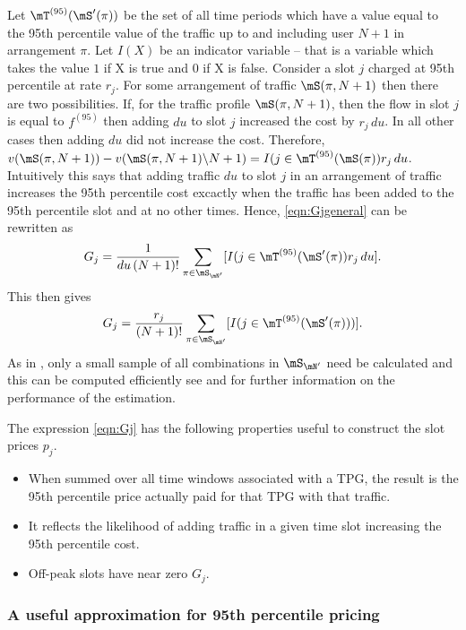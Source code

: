 Let $\mT^{(95)}(\mS'(\pi))$ be the set of all
time periods which have a value equal to the 95th percentile value
of the traffic up to and including user $N+1$ in arrangement $\pi$.
Let $I(X)$ be an indicator variable -- that is a variable which takes
the value $1$ if X is true and $0$ if X is false.
Consider a slot $j$ charged at
95th percentile at rate $r_j$.  
For some arrangement of traffic $\mS(\pi,N+1)$ then there are two
possibilities.  If, for the traffic profile $\mS(\pi,N+1)$, then 
the flow in slot $j$ is equal to $f^{(95)}$ then adding $du$ to
slot $j$ increased the cost by $r_j \, du$.  In all other cases
then adding $du$ did not increase the cost.  Therefore,
$v(\mS(\pi,N+1)) - 
v(\mS(\pi,N+1) \backslash N+1) = I (j \in \mT^{(95)}(\mS(\pi)) r_j \, du$.
Intuitively this says that adding traffic $du$ to slot $j$ in
an arrangement of traffic increases the 95th percentile 
cost excactly when the traffic has been added to the 95th percentile
slot and at no other times.
Hence,  
\eqref{eqn:Gjgeneral} can be rewritten as
$$
G_j = \frac{1}{du\, (N+1)!}  
\sum_{\pi \in \mS_{\mN'}} [I (j \in \mT^{(95)}(\mS'(\pi)) r_j \, du ].
$$ 
This then gives
\begin{equation}
G_j = \frac{r_j}{ (N+1)!} \sum_{\pi \in \mS_{\mN'}} 
[I (j \in \mT^{(95)}(\mS'(\pi))) ].
\label{eqn:Gj}
\end{equation}
As in \cite{stanojevic2010heavy}, only a small sample
of all combinations in $\mS_{\mN'}$ need be calculated and
this can be computed efficiently see \cite{stanojevic2010heavy}
and \cite{lakhina_cost_2012} for further information on the
performance of the estimation.

The expression \eqref{eqn:Gj} has the following properties useful to construct the 
slot prices $p_j$.
\begin{itemize}
\item When summed over all time windows associated with a TPG, 
the result is the 95th percentile price actually paid for that TPG
with that traffic.
\item It reflects the likelihood of adding traffic in a given time
slot increasing the 95th percentile cost.
\item Off-peak slots have near zero $G_j$.
\end{itemize}

\subsubsection{A useful approximation for 95th percentile pricing}

